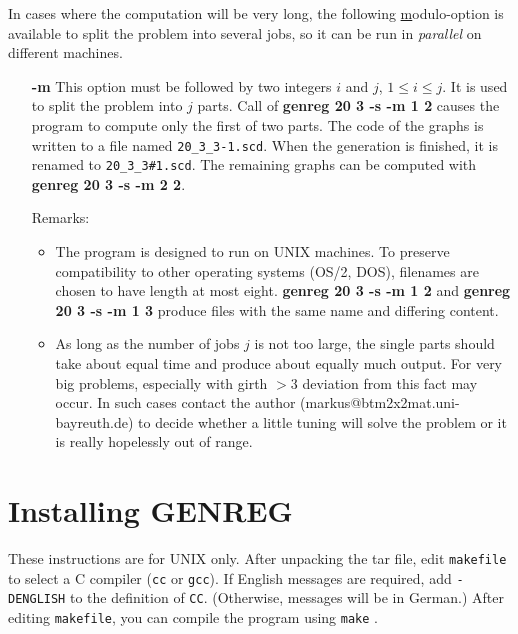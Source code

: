\documentclass[11pt]{article}
\begin{document}
In cases where the computation will be very long, the following
\underline{m}odulo-option is available to split the problem
into several jobs, so it can be run in {\em parallel}
on different machines.
\begin{itemize}
 \item[\bf -m]
  This option must be followed by two integers $i$ and $j$, 
  $1\le i\le j$. It is used to split the problem into $j$ parts.
  Call of {\bf genreg 20 3 -s -m 1 2} causes the program
  to compute only the first of two parts. The code of the graphs
  is written to a file named \verb|20_3_3-1.scd|. When the 
  generation is finished, it is renamed to \verb|20_3_3#1.scd|.
  The remaining graphs can be computed with {\bf genreg 20 3 -s -m 2 2}.

  Remarks:
 
  \begin{itemize}
   \item
    The program is designed to run on UNIX machines.
    To preserve compatibility to other operating systems 
    (OS/2, DOS), filenames are chosen to have
    length at most eight. {\bf genreg 20 3 -s -m 1 2} and
    {\bf genreg 20 3 -s -m 1 3} produce files with the same
    name and differing content.

   \item
    As long as the number of jobs $j$ is not too large, the 
    single parts should take about equal time and produce about
    equally much output.  For very big problems, especially
    with girth $>3$ deviation from this fact may occur.  
    In such cases contact the author 
    (markus@btm2x2mat.uni-bayreuth.de) 
    to decide whether a little tuning will solve the problem
    or it is really hopelessly out of  range.
  \end{itemize}
\end{itemize}  

\section*{Installing GENREG}

These instructions are for UNIX only.  After unpacking the tar
file, edit \verb|makefile| to select a C compiler (\verb|cc| or
\verb|gcc|).  If English messages are required, add \verb|-DENGLISH|
to the definition of \verb|CC|.  (Otherwise, messages will be in
German.)  After editing \verb|makefile|, you can compile the
program using \verb|make| .
\end{document}
